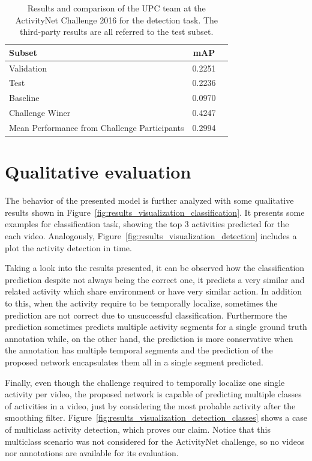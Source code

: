 \begin{table}[H]
\begin{center}
\begin{tabular}{|l|c|c|}
\hline
Subset & mAP \\
\hline\hline
Validation & 0.2251 \\
Test & 0.2236 \\
\hline\hline
Baseline~\cite{caba2015activitynet} & 0.0970 \\
Challenge Winer & 0.4247 \\
Mean Performance from Challenge Participants & 0.2994 \\
\hline
\end{tabular}
\end{center}
\caption{Results and comparison of the UPC team at the ActivityNet Challenge 2016 for the detection task. The third-party results are all referred to the test subset.}
\label{table:detection_results_challenge}
\end{table}

\section{Qualitative evaluation}

The behavior of the presented model is further analyzed with some qualitative results shown in Figure~\ref{fig:results_visualization_classification}. It presents some examples for classification task, showing the top 3 activities predicted for the each video. Analogously, Figure~\ref{fig:results_visualization_detection} includes a plot the activity detection in time.

Taking a look into the results presented, it can be observed how the classification prediction despite not always being the correct one, it predicts a very similar and related activity which share environment or have very similar action. In addition to this, when the activity require to be temporally localize, sometimes the prediction are not correct due to unsuccessful classification. Furthermore the prediction sometimes predicts multiple activity segments for a single ground truth annotation while, on the other hand, the prediction is more conservative when the annotation has multiple temporal segments and the prediction of the proposed network encapsulates them all in a single segment predicted.

Finally, even though the challenge required to temporally localize one single activity per video, the proposed network is capable of predicting multiple classes of activities in a video, just by considering the most probable activity after the smoothing filter.
Figure~\ref{fig:results_visualization_detection_classes} shows a case of multiclass activity detection, which proves our claim.
Notice that this multiclass scenario was not considered for the ActivityNet challenge, so no videos nor annotations are available for its evaluation.

